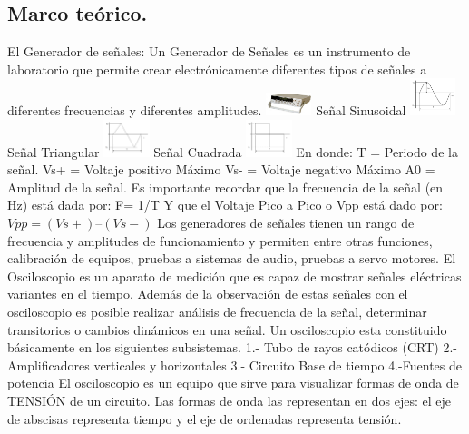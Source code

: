 \documentclass[10pt]{article}
\begin{document}
\begin{multicols}{2}
\section{Marco teórico.}
El Generador de señales: Un Generador de Señales es un instrumento de laboratorio que permite crear electrónicamente diferentes tipos de señales a diferentes frecuencias y diferentes amplitudes.
\includegraphics[width=0.1\textwidth]{Imagenes/Marco Teorico/Imagen1}
Señal Sinusoidal
\includegraphics[width=0.1\textwidth]{Imagenes/Marco Teorico/Imagen2}
Señal Triangular
\includegraphics[width=0.1\textwidth]{Imagenes/Marco Teorico/Imagen3}
Señal Cuadrada
\includegraphics[width=0.1\textwidth]{Imagenes/Marco Teorico/Imagen4}
En donde:
T = Periodo de la señal. 
Vs+ = Voltaje positivo Máximo
Vs- = Voltaje negativo Máximo
A0 = Amplitud de la señal.
Es importante recordar que la frecuencia de la señal (en Hz) está dada por:
F= 1/T
Y que el Voltaje Pico a Pico o Vpp está dado por:
$Vpp= (Vs+) – (Vs-)$
Los generadores de señales tienen un rango de frecuencia y amplitudes de funcionamiento y permiten entre otras funciones, calibración de equipos, pruebas a sistemas de audio, pruebas a servo motores.
El Osciloscopio es un aparato de medición que es capaz de mostrar señales eléctricas variantes en el tiempo. Además de la observación de estas señales con el osciloscopio es posible realizar análisis de frecuencia de la señal, determinar transitorios o cambios dinámicos en una señal.
Un osciloscopio esta constituido básicamente en los siguientes subsistemas.
1.- Tubo de rayos catódicos (CRT)
2.- Amplificadores verticales y horizontales
3.- Circuito Base de tiempo
4.-Fuentes de potencia
El osciloscopio es un equipo que sirve para visualizar formas de onda de TENSIÓN de un circuito. Las formas de onda las representan en dos ejes: el eje de abscisas representa tiempo y el eje de ordenadas representa tensión.


\end{multicols}
\end{document}
